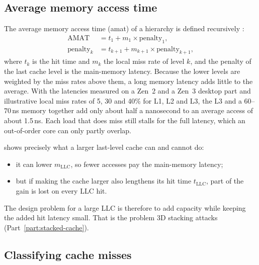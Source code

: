 

\subsection{Average memory access time}
\label{sec:amat}

The average memory access time (\gls{amat}) of a hierarchy is defined recursively \cite[sec.~11.3.1]{sarangi2025basic}:
\begin{equation}
\begin{aligned}
  \mathrm{AMAT} &= t_1 + m_1 \times \mathrm{penalty}_1,\\
  \mathrm{penalty}_{k} &= t_{k+1} + m_{k+1} \times \mathrm{penalty}_{k+1},
\end{aligned}
\label{eq:amat}
\end{equation}
where $t_k$ is the hit time and $m_k$ the local miss rate of level $k$, and the penalty of the last cache level is the main-memory latency. Because the lower levels are weighted by the miss rates above them, a long memory latency adds little to the average. With the latencies measured on a Zen~2 and a Zen~3 desktop part \cite{justiceAMDRyzen72021} and illustrative local miss rates of 5, 30 and 40\% for L1, L2 and L3, the L3 and a 60--70\,ns memory together add only about half a nanosecond to an average access of about 1.5\,ns. Each load that does miss still stalls for the full latency, which an out-of-order core can only partly overlap.

 shows precisely what a larger last-level cache can and cannot do:
\begin{itemize}
  \item it can lower $m_{\mathrm{LLC}}$, so fewer accesses pay the main-memory latency;
  \item but if making the cache larger also lengthens its hit time $t_{\mathrm{LLC}}$, part of the gain is lost on every LLC hit.
\end{itemize}
The design problem for a large LLC is therefore to add capacity while keeping the added hit latency small. That is the problem 3D stacking attacks (Part~\ref{part:stacked-cache}).

\subsection{Classifying cache misses}
\label{sec:miss-classes}

